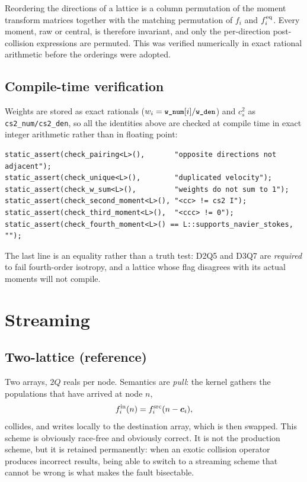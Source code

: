 \documentclass[11pt,a4paper]{article}
\newcommand{\code}[1]{\texttt{\small #1}}
\newcommand{\cs}{c_s}
\newcommand{\ci}{\bm{c}_i}
\begin{document}
Reordering the directions of a lattice is a column permutation of the moment
transform matrices together with the matching permutation of $f_i$ and
$f_i^{\rm eq}$. Every moment, raw or central, is therefore invariant, and only
the per-direction post-collision expressions are permuted. This was verified
numerically in exact rational arithmetic before the orderings were adopted.

\subsection{Compile-time verification}

Weights are stored as exact rationals ($w_i = \code{w\_num}[i]/\code{w\_den}$) and
$\cs^2$ as \code{cs2\_num/cs2\_den}, so all the identities above are checked at
compile time in exact integer arithmetic rather than in floating point:

\begin{lstlisting}[basicstyle=\ttfamily\scriptsize]
static_assert(check_pairing<L>(),       "opposite directions not adjacent");
static_assert(check_unique<L>(),        "duplicated velocity");
static_assert(check_w_sum<L>(),         "weights do not sum to 1");
static_assert(check_second_moment<L>(), "<cc> != cs2 I");
static_assert(check_third_moment<L>(),  "<ccc> != 0");
static_assert(check_fourth_moment<L>() == L::supports_navier_stokes, "");
\end{lstlisting}

The last line is an equality rather than a truth test: D2Q5 and D3Q7 are
\emph{required} to fail fourth-order isotropy, and a lattice whose flag disagrees
with its actual moments will not compile.

\section{Streaming}

\subsection{Two-lattice (reference)}

Two arrays, $2Q$ reals per node. Semantics are \emph{pull}: the kernel gathers
the populations that have arrived at node $n$,
\begin{equation}
  f_i^{\rm in}(n) = f_i^{\rm src}(n - \ci),
\end{equation}
collides, and writes locally to the destination array, which is then swapped.
This scheme is obviously race-free and obviously correct. It is not the
production scheme, but it is retained permanently: when an exotic collision
operator produces incorrect results, being able to switch to a streaming scheme
that cannot be wrong is what makes the fault bisectable.
\end{document}

